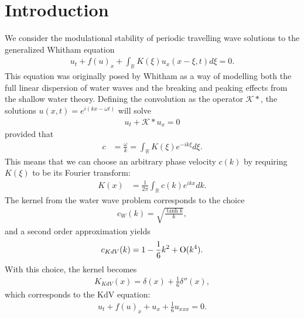 \documentclass[11pt,leqno]{article}
\numberwithin{equation}{section}
\newcommand{\R}{\mathbb R}
\theoremstyle{definition}
\begin{document}
\section{Introduction}\label{S:intro}

We consider the modulational stability of periodic travelling wave solutions to the generalized Whitham equation
\begin{align}\label{e:Whitham}
    u_t + f(u)_x + \int_{\R}K(\xi)u_x(x-\xi,t)d\xi = 0.
\end{align}
This equation was originally posed by Whitham \cite{Whitham1967,Whitham1999} as a way of modelling both the full linear dispersion of water waves and the breaking and peaking effects from the shallow water theory. Defining the convolution as the operator $ \mathcal{K}* $, the solutions $ u(x,t) = e^{i(kx -\omega t)} $ will solve
\begin{align*}
	u_{t} + \mathcal{K}*u_{x} = 0
\end{align*}
provided that 
\begin{align*}
	c &= \frac{\omega}{k} = \int_{\R}K(\xi)e^{-ik\xi}d\xi.
\end{align*}
This means that we can choose an arbitrary phase velocity $ c(k) $ by requiring $ K(\xi) $ to be its Fourier transform:
\begin{align*}
	K(x) &= \frac{1}{2\pi}\int_{\R}c(k)e^{ikx}dk.
\end{align*}
The kernel from the water wave problem corresponds to the choice
\begin{align}
	c_{W}(k) = \sqrt{\frac{\tanh k}{k}}, \label{eq:WhithamWater}
\end{align}
and a second order approximation yields
\begin{align*}
	c_{KdV}(k) = 1 - \frac{1}{6}k^{2} + {\rm O}(k^{4}).
\end{align*}
With this choice, the kernel becomes
\begin{align*}
	K_{KdV}(x) = \delta(x) + \frac{1}{6}\delta''(x),
\end{align*}
which corresponds to the KdV equation:
\begin{align}
	u_{t} + f(u)_{x} + u_{x} + \frac{1}{6}u_{xxx} = 0.\label{eq:KdV}
\end{align}
\end{document}
